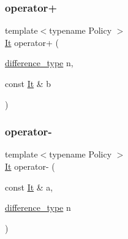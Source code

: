 \subsubsection{\texorpdfstring{operator+}{operator+}\hspace{0.1cm}{\footnotesize\ttfamily [2/2]}}
{\footnotesize\ttfamily template$<$typename Policy $>$ \\
\mbox{\hyperlink{classgeneric__iterator}{It}} operator+ (\begin{DoxyParamCaption}\item[{\mbox{\hyperlink{classgeneric__iterator_a307cd6eddc16127eb873d76bcfc07233}{difference\+\_\+type}}}]{n,  }\item[{const \mbox{\hyperlink{classgeneric__iterator}{It}} \&}]{b }\end{DoxyParamCaption})\hspace{0.3cm}{\ttfamily [friend]}}

\mbox{\label{classgeneric__iterator_a040063b4d21cbdf70abffd52563067da}} 
\subsubsection{\texorpdfstring{operator-\/}{operator-}\hspace{0.1cm}{\footnotesize\ttfamily [1/2]}}
{\footnotesize\ttfamily template$<$typename Policy $>$ \\
\mbox{\hyperlink{classgeneric__iterator}{It}} operator-\/ (\begin{DoxyParamCaption}\item[{const \mbox{\hyperlink{classgeneric__iterator}{It}} \&}]{a,  }\item[{\mbox{\hyperlink{classgeneric__iterator_a307cd6eddc16127eb873d76bcfc07233}{difference\+\_\+type}}}]{n }\end{DoxyParamCaption})\hspace{0.3cm}{\ttfamily [friend]}}

\mbox{\label{classgeneric__iterator_a970506dfb104f24039493a495ff45a2e}} 
